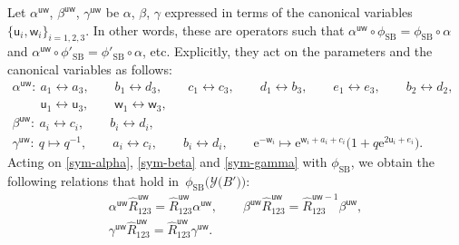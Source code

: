 \documentclass[pdftex]{sigma}
\newcommand{\e}{{\mathrm e}}
\newcommand{\uu}{{\mathsf u}}
\newcommand{\ww}{{\mathsf w}}
\numberwithin{equation}{section}
\begin{document}
Let $\alpha^{\uu\ww}$, $\beta^{\uu\ww}$, $\gamma^{\uu\ww}$ be $\alpha$, $\beta$,
$\gamma$ expressed in terms of the canonical variables
$\{\uu_i, \ww_i\}_{i=1,2,3}$. In other words, these are operators such
that $\alpha^{\uu\ww} \circ \phi_\mathrm{SB} = \phi_\mathrm{SB} \circ \alpha$
and
$\alpha^{\uu\ww} \circ \phi'_\mathrm{SB} = \phi'_\mathrm{SB} \circ \alpha$, etc.
Explicitly, they act on the parameters and the canonical variables as follows:
\begin{gather}
 \alpha^{\uu\ww}\colon\
 a_1 \leftrightarrow a_3, \qquad
 b_1 \leftrightarrow d_3, \qquad
 c_1 \leftrightarrow c_3, \qquad
 d_1 \leftrightarrow b_3, \qquad
 e_1 \leftrightarrow e_3, \qquad
 b_2 \leftrightarrow d_2, \qquad
\nonumber \\
 \phantom{ \alpha^{\uu\ww}\colon\ }{} \uu_1 \leftrightarrow \uu_3, \qquad
 \ww_1 \leftrightarrow \ww_3,
\label{uwal} \\
 \beta^{\uu\ww}\colon\
 a_i \leftrightarrow c_i, \qquad
 b_i \leftrightarrow d_i,\nonumber
 \\
 \gamma^{\uu\ww}\colon\
 q \mapsto q^{-1}, \qquad
 a_i \leftrightarrow c_i, \qquad
 b_i \leftrightarrow d_i, \qquad
 \e^{-\ww_i} \mapsto \e^{\ww_i + a_i + c_i} \bigl(1 + q \e^{2\uu_i + e_i}\bigr).\nonumber
\end{gather}
Acting on \eqref{sym-alpha}, \eqref{sym-beta} and \eqref{sym-gamma}
with $\phi_\mathrm{SB}$, we obtain the following relations that hold
in~$\phi_\mathrm{SB}\bigl(\mathcal{Y}\bigl(B'\bigr)\bigr)$:
\begin{gather}%
 \alpha^{\uu\ww} \widehat{R}^{\uu\ww}_{123} = \widehat{R}^{\uu\ww}_{123} \alpha^{\uu\ww},
 \qquad
 \beta^{\uu\ww} \widehat{R}^{\uu\ww}_{123} = \widehat{R}^{\uu\ww -1}_{123} \beta^{\uu\ww}, \label{alphauw-Rhat}
 \\
 \gamma^{\uu\ww} \widehat{R}^{\uu\ww}_{123} = \widehat{R}^{\uu\ww}_{123} \gamma^{\uu\ww}.
 \label{gammauw-Rhat}
\end{gather}
\end{document}
